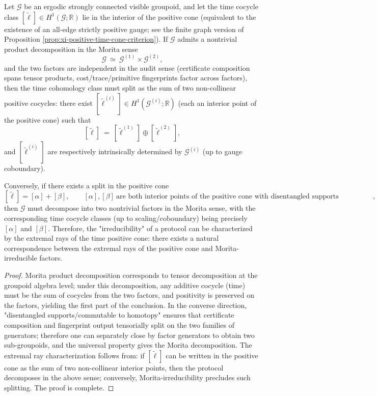 \begin{theorem}\label{thm:xi-time-ray-prime-factorization-rigidity}
Let \(\mathcal G\) be an ergodic strongly connected visible groupoid, and let the time cocycle class \([\widetilde\ell]\in H^1(\mathcal G;\mathbb R)\) lie in the interior of the positive cone (equivalent to the existence of an all-edge strictly positive gauge; see the finite graph version of Proposition \ref{prop:xi-positive-time-cone-criterion}).
If \(\mathcal G\) admits a nontrivial product decomposition in the Morita sense
\[
\mathcal G\ \simeq\ \mathcal G^{(1)}\times \mathcal G^{(2)},
\]
and the two factors are independent in the audit sense (certificate composition spans tensor products, cost/trace/primitive fingerprints factor across factors),
then the time cohomology class must split as the sum of two non-collinear positive cocycles: there exist \([\widetilde\ell^{(i)}]\in H^1(\mathcal G^{(i)};\mathbb R)\) (each an interior point of the positive cone) such that
\[
[\widetilde\ell]\ =\ [\widetilde\ell^{(1)}]\oplus[\widetilde\ell^{(2)}],
\]
and \([\widetilde\ell^{(i)}]\) are respectively intrinsically determined by \(\mathcal G^{(i)}\) (up to gauge coboundary).
\par
Conversely, if there exists a split in the positive cone
\[
[\widetilde\ell]=[\alpha]+[\beta],
\qquad
[\alpha],[\beta]\ \text{are both interior points of the positive cone with disentangled supports (commutable to homotopy at the certificate level)},
\]
then \(\mathcal G\) must decompose into two nontrivial factors in the Morita sense, with the corresponding time cocycle classes (up to scaling/coboundary) being precisely \([\alpha]\) and \([\beta]\).
Therefore, the "irreducibility" of a protocol can be characterized by the extremal rays of the time positive cone: there exists a natural correspondence between the extremal rays of the positive cone and Morita-irreducible factors.
\end{theorem}
\begin{proof}
Morita product decomposition corresponds to tensor decomposition at the groupoid algebra level; under this decomposition, any additive cocycle (time) must be the sum of cocycles from the two factors, and positivity is preserved on the factors, yielding the first part of the conclusion.
In the converse direction, "disentangled supports/commutable to homotopy" ensures that certificate composition and fingerprint output tensorially split on the two families of generators; therefore one can separately close by factor generators to obtain two sub-groupoids, and the universal property gives the Morita decomposition.
The extremal ray characterization follows from: if \([\widetilde\ell]\) can be written in the positive cone as the sum of two non-collinear interior points, then the protocol decomposes in the above sense; conversely, Morita-irreducibility precludes such splitting. The proof is complete.
\end{proof}


